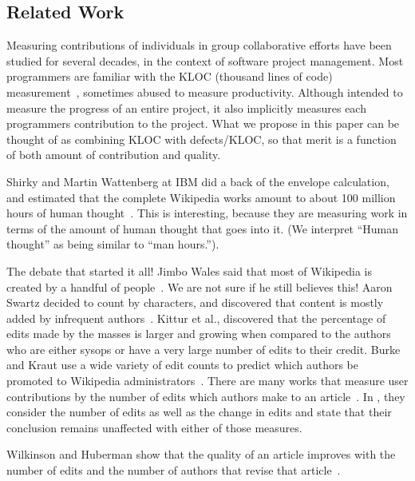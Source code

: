 \subsection{Related Work}

Measuring contributions of individuals in group collaborative
efforts have been studied for several decades, in the context of
software project management.
Most programmers are familiar with the KLOC (thousand lines of 
code) measurement~\cite{MITRE1988, SLOC1992},
sometimes abused to measure productivity.
Although intended to measure the progress of an
entire project, it also implicitly 
measures each programmers contribution to the project.
What we propose in this paper can be thought of as combining
KLOC with defects/KLOC, so that merit is a function of both
amount of contribution and quality.

Shirky and Martin Wattenberg at IBM did a back of the
envelope calculation, and estimated that the complete Wikipedia
works amount to about 100 million hours of human
thought~\cite{CognitiveSurplus2008}.
This is interesting, because they are measuring work
in terms of the amount of human thought that goes into it.
(We interpret ``Human thought'' as being similar 
to ``man hours.'').

The debate that started it all!
Jimbo Wales said that most of Wikipedia is created by
a handful of people~\cite{Wales2005}.
We are not sure if he still believes this!
Aaron Swartz decided to count by characters,
and discovered that content is mostly added
by infrequent authors~\cite{Swartz2006}.
Kittur et al., \cite{Bourgeoisie2007} discovered that the
percentage of edits made by the masses is larger and growing 
when compared to the authors who are either sysops or have a 
very large number of edits to their credit.
Burke and Kraut use a wide variety of edit counts to predict
which authors be promoted to Wikipedia 
administrators~\cite{AdministratorMop2008}.
There are many works that measure user contributions by the
number of edits which authors make to an 
article~\cite{Wales2005,EditsEqQuality2007,Bourgeoisie2007,
WikiDashboard2008,OrtegaBarahona2007,SteinHess2007}.
In \cite{Bourgeoisie2007}, they consider the number of edits
as well as the change in edits and state that their conclusion
remains unaffected with either of those measures.

Wilkinson and Huberman show that the quality of an article improves
with the number of edits and the number of authors that revise
that article~\cite{EditsEqQuality2007}.

